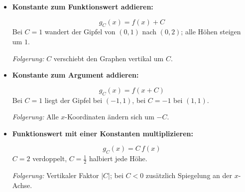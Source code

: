 \begin{itemize}[leftmargin=*,itemsep=0.9\baselineskip,topsep=0.5\baselineskip]
  \item \textbf{Konstante zum Funktionswert addieren:}
    \par\smallskip
    \begin{minipage}[c]{0.40\linewidth}
      \raggedright
      \[
        g_C(x)=f(x)+C
      \]
      Bei $C=1$ wandert der Gipfel von $(0,1)$ nach $(0,2)$;
      alle Höhen steigen um $1$.
      \par\smallskip
      \emph{Folgerung:} $C$ verschiebt den Graphen vertikal um $C$.
    \end{minipage}\hfill
    \begin{minipage}[c]{0.55\linewidth}
      \centering
    \end{minipage}

  \item \textbf{Konstante zum Argument addieren:}
    \par\smallskip
    \begin{minipage}[c]{0.40\linewidth}
      \raggedright
      \[
        g_C(x)=f(x+C)
      \]
      Bei $C=1$ liegt der Gipfel bei $(-1,1)$, bei $C=-1$ bei $(1,1)$.
      \par\smallskip
      \emph{Folgerung:} Alle $x$-Koordinaten ändern sich um $-C$.
    \end{minipage}\hfill
    \begin{minipage}[c]{0.55\linewidth}
      \centering
    \end{minipage}

  \item \textbf{Funktionswert mit einer Konstanten multiplizieren:}
    \par\smallskip
    \begin{minipage}[c]{0.40\linewidth}
      \raggedright
      \[
        g_C(x)=C\,f(x)
      \]
      $C=2$ verdoppelt, $C=\tfrac12$ halbiert jede Höhe.
      \par\smallskip
      \emph{Folgerung:} Vertikaler Faktor $|C|$;
      bei $C<0$ zusätzlich Spiegelung an der $x$-Achse.
    \end{minipage}\hfill
    \begin{minipage}[c]{0.55\linewidth}
      \centering
    \end{minipage}


\end{itemize}
